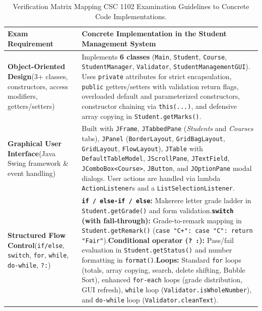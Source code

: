 \documentclass[10pt,a4paper]{article}
\begin{document}
\begin{table}[H]
\centering
\caption{Verification Matrix Mapping CSC 1102 Examination Guidelines to Concrete Code Implementations.}
\label{tab:requirements}
\footnotesize
\renewcommand{\arraystretch}{0.92}
\setlength{\tabcolsep}{4.5pt}
\begin{tabular}{@{}p{3.4cm} p{14.2cm}@{}}
\toprule
\textbf{Exam Requirement} & \textbf{Concrete Implementation in the Student Management System} \\
\midrule
\textbf{Object-Oriented Design}\newline (3+ classes, constructors, access modifiers, getters/setters) & Implements \textbf{6 classes} (\texttt{Main}, \texttt{Student}, \texttt{Course}, \texttt{StudentManager}, \texttt{Validator}, \texttt{StudentManagementGUI}). Uses \texttt{private} attributes for strict encapsulation, \texttt{public} getters/setters with validation return flags, overloaded default and parameterized constructors, constructor chaining via \texttt{this(...)}, and defensive array copying in \texttt{Student.getMarks()}. \\
\addlinespace[1pt]
\textbf{Graphical User Interface}\newline (Java Swing framework \& event handling) & Built with \texttt{JFrame}, \texttt{JTabbedPane} (\textit{Students} and \textit{Courses} tabs), \texttt{JPanel} (\texttt{BorderLayout}, \texttt{GridBagLayout}, \texttt{GridLayout}, \texttt{FlowLayout}), \texttt{JTable} with \texttt{DefaultTableModel}, \texttt{JScrollPane}, \texttt{JTextField}, \texttt{JComboBox<Course>}, \texttt{JButton}, and \texttt{JOptionPane} modal dialogs. User actions are handled via lambda \texttt{ActionListener}s and a \texttt{ListSelectionListener}. \\
\addlinespace[1pt]
\textbf{Structured Flow Control}\newline (\texttt{if/else}, \texttt{switch}, \texttt{for}, \texttt{while}, \texttt{do-while}, \texttt{?:}) & \textbf{\texttt{if / else-if / else}:} Makerere letter grade ladder in \texttt{Student.getGrade()} and form validation.\newline \textbf{\texttt{switch} (with fall-through):} Grade-to-remark mapping in \texttt{Student.getRemark()} (\texttt{case "C+": case "C": return "Fair"}).\newline \textbf{Conditional operator (\texttt{? :}):} Pass/fail evaluation in \texttt{Student.getStatus()} and number formatting in \texttt{format()}.\newline \textbf{Loops:} Standard \texttt{for} loops (totals, array copying, search, delete shifting, Bubble Sort), enhanced \texttt{for-each} loops (grade distribution, GUI refresh), \texttt{while} loop (\texttt{Validator.isWholeNumber}), and \texttt{do-while} loop (\texttt{Validator.cleanText}). \\

\end{tabular}
\end{table}
\end{document}
